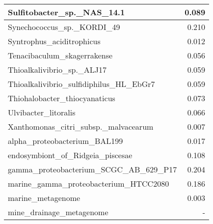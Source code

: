 \documentclass[12pt,a4paper]{article}
\begin{document}
\begin{table}[ht]
\begin{center}
\begin{tabular}{|l*{1}{|r}|}
Sulfitobacter\_sp.\_NAS\_14.1 & 0.089 \\ \hline
Synechococcus\_sp.\_KORDI\_49 & 0.210 \\ \hline
Syntrophus\_aciditrophicus & 0.012 \\ \hline
Tenacibaculum\_skagerrakense & 0.056 \\ \hline
Thioalkalivibrio\_sp.\_ALJ17 & 0.059 \\ \hline
Thioalkalivibrio\_sulfidiphilus\_HL\_EbGr7 & 0.059 \\ \hline
Thiohalobacter\_thiocyanaticus & 0.073 \\ \hline
Ulvibacter\_litoralis & 0.066 \\ \hline
Xanthomonas\_citri\_subsp.\_malvacearum & 0.007 \\ \hline
alpha\_proteobacterium\_BAL199 & 0.017 \\ \hline
endosymbiont\_of\_Ridgeia\_piscesae & 0.108 \\ \hline
gamma\_proteobacterium\_SCGC\_AB\_629\_P17 & 0.204 \\ \hline
marine\_gamma\_proteobacterium\_HTCC2080 & 0.186 \\ \hline
marine\_metagenome & 0.003 \\ \hline
mine\_drainage\_metagenome & - \\ \hline
\end{tabular}
\end{center}
\end{table}
\end{document}
